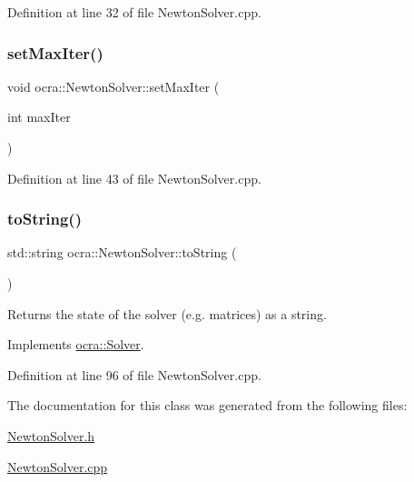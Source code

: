 Definition at line 32 of file Newton\+Solver.\+cpp.

\hypertarget{classocra_1_1NewtonSolver_a7bea41cafca30faf5dca35a7e3bd8a2e}{}\label{classocra_1_1NewtonSolver_a7bea41cafca30faf5dca35a7e3bd8a2e} 
\subsubsection{\texorpdfstring{set\+Max\+Iter()}{setMaxIter()}}
{\footnotesize\ttfamily void ocra\+::\+Newton\+Solver\+::set\+Max\+Iter (\begin{DoxyParamCaption}\item[{int}]{max\+Iter }\end{DoxyParamCaption})}



Definition at line 43 of file Newton\+Solver.\+cpp.

\hypertarget{classocra_1_1NewtonSolver_a3d498cc7771cf3cf733552a35fd77006}{}\label{classocra_1_1NewtonSolver_a3d498cc7771cf3cf733552a35fd77006} 
\subsubsection{\texorpdfstring{to\+String()}{toString()}}
{\footnotesize\ttfamily std\+::string ocra\+::\+Newton\+Solver\+::to\+String (\begin{DoxyParamCaption}{ }\end{DoxyParamCaption})\hspace{0.3cm}{\ttfamily [virtual]}}

Returns the state of the solver (e.\+g. matrices) as a string. 

Implements \hyperlink{classocra_1_1Solver_ab3783d1c208500bfb1daa3e1abf34146}{ocra\+::\+Solver}.



Definition at line 96 of file Newton\+Solver.\+cpp.



The documentation for this class was generated from the following files\+:\begin{DoxyCompactItemize}
\item 
\hyperlink{NewtonSolver_8h}{Newton\+Solver.\+h}\item 
\hyperlink{NewtonSolver_8cpp}{Newton\+Solver.\+cpp}\end{DoxyCompactItemize}
